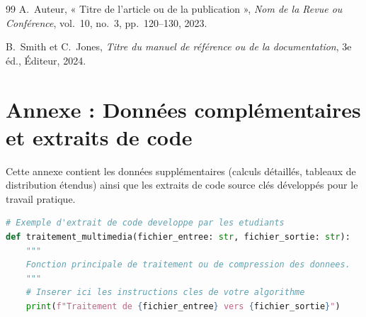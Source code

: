 \documentclass[12pt,letterpaper]{article}
\begin{document}
\begin{thebibliography}{99}
    A.~Auteur, « Titre de l'article ou de la publication », \textit{Nom de la Revue ou Conférence}, vol.~10, no.~3, pp.~120--130, 2023.
    
    B.~Smith et C.~Jones, \textit{Titre du manuel de référence ou de la documentation}, 3e éd., Éditeur, 2024.
\end{thebibliography}

\newpage
\appendix
\section{Annexe : Données complémentaires et extraits de code}
\label{sec:annexe}

Cette annexe contient les données supplémentaires (calculs détaillés, tableaux de distribution étendus) ainsi que les extraits de code source clés développés pour le travail pratique.

\begin{lstlisting}[language=Python, caption={Exemple d'extrait de code source pour le traitement multimédia.}]
# Exemple d'extrait de code developpe par les etudiants
def traitement_multimedia(fichier_entree: str, fichier_sortie: str):
    """
    Fonction principale de traitement ou de compression des donnees.
    """
    # Inserer ici les instructions cles de votre algorithme
    print(f"Traitement de {fichier_entree} vers {fichier_sortie}")
\end{lstlisting}
\end{document}
